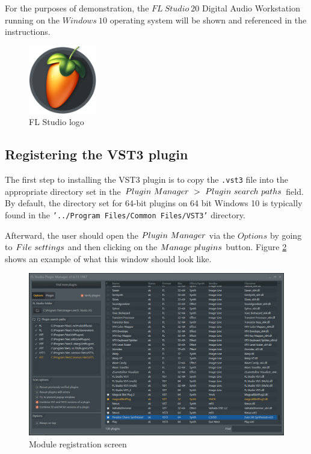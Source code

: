 \documentclass[a4paper,12pt]{report}
\begin{document}
For the purposes of demonstration, the $FL\ Studio\ 20$ Digital Audio Workstation running on the $Windows\ 10$ operating system will be shown and referenced in the instructions.

\begin{figure}[h] \centering
\includegraphics[width=8em]{FLStudioLogo.png}
    \caption{FL Studio logo \cite{floverview}}
    \label{fig:FLLogo}
\end{figure}

\subsection{Registering the VST3 plugin}
\label{subsec:registeringvsti}
The first step to installing the VST3 plugin is to copy the \texttt{.vst3} file into the appropriate directory set in the $Plugin\ \-Manager\ \->\ \-Plugin\ \-search\ \-paths$ field. By default, the directory set for 64-bit plugins on 64 bit Windows 10 is typically found in the \texttt{'../Program Files/Common Files/VST3'} directory. 

Afterward, the user should open the $Plugin\ \-Manager$ via the $Options$ by going to $File\ \-settings$ and then clicking on the $Manage\ \-plugins$ button. Figure \ref{fig:modulereg} shows an example of what this window should look like.

\begin{figure}[h] \centering
\includegraphics[width=36em]{ModuleRegistration.png}
    \caption{Module registration screen}     \label{fig:modulereg} \end{figure}
\end{document}

